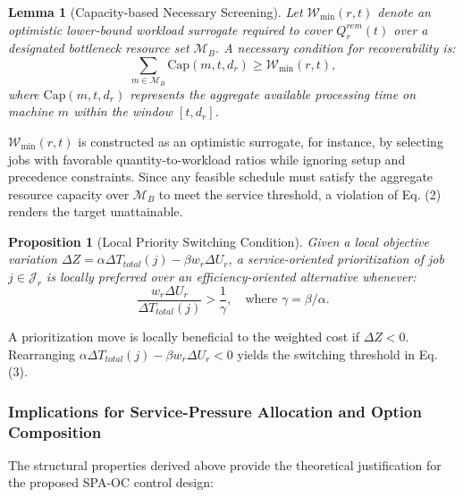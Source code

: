 \documentclass[a4paper,fleqn]{cas-sc}
\newtheorem{lemma}[theorem]{Lemma}
\newtheorem{proposition}{Proposition}
\begin{document}
\begin{lemma}[Capacity-based Necessary Screening]
\label{lemma:capacity_bound}
Let $\mathcal{W}_{\min}(r, t)$ denote an optimistic lower-bound workload surrogate required to cover $Q_r^{rem}(t)$ over a designated bottleneck resource set $\mathcal{M}_B$. A necessary condition for recoverability is:
\begin{equation}
\sum_{m \in \mathcal{M}_B} \text{Cap}(m, t, d_r) \ge \mathcal{W}_{\min}(r, t),
\end{equation}
where $\text{Cap}(m, t, d_r)$ represents the aggregate available processing time on machine $m$ within the window $[t, d_r]$.
\end{lemma}

\begin{pf}
$\mathcal{W}_{\min}(r, t)$ is constructed as an optimistic surrogate, for instance, by selecting jobs with favorable quantity-to-workload ratios while ignoring setup and precedence constraints. Since any feasible schedule must satisfy the aggregate resource capacity over $\mathcal{M}_B$ to meet the service threshold, a violation of Eq. (2) renders the target unattainable.
\end{pf}

\begin{proposition}[Local Priority Switching Condition]
\label{prop:priority}
Given a local objective variation $\Delta Z = \alpha \Delta T_{total}(j) - \beta w_r \Delta U_r$, a service-oriented prioritization of job $j \in \mathcal{J}_r$ is locally preferred over an efficiency-oriented alternative whenever:
\begin{equation}
\frac{w_r \Delta U_r}{\Delta T_{total}(j)} > \frac{1}{\gamma}, \quad \text{where } \gamma = \beta/\alpha.
\end{equation}
\end{proposition}

\begin{pf}
A prioritization move is locally beneficial to the weighted cost if $\Delta Z < 0$. Rearranging $\alpha \Delta T_{total}(j) - \beta w_r \Delta U_r < 0$ yields the switching threshold in Eq. (3). 
\end{pf}

\subsubsection{Implications for Service-Pressure Allocation and Option Composition}

The structural properties derived above provide the theoretical justification for the proposed SPA-OC control design:
\end{document}
